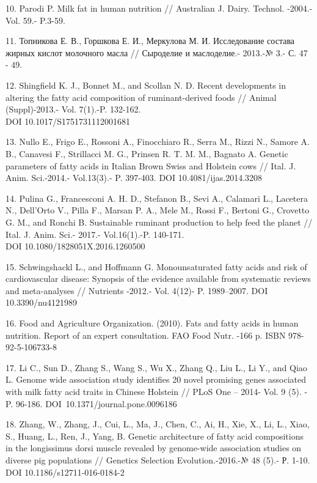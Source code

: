 \begin{noparindent}
10. Parodi P. Milk fat in human nutrition // Australian J. Dairy.
Technol. -2004.-Vol. 59.- P.3-59.

11. Топникова Е. В., Горшкова Е. И., Меркулова М. И. Исследование
состава жирных кислот молочного масла // Сыроделие и маслоделие.-
2013.-№ 3.- С. 47 - 49.

12. Shingfield K. J., Bonnet M., and Scollan N. D. Recent developments
in altering the fatty acid composition of ruminant-derived foods //
Animal (Suppl)-2013.- Vol. 7(1).-P. 132-162. \\DOI 10.1017/S1751731112001681

13. Nullo E., Frigo E., Rossoni A., Finocchiaro R., Serra M., Rizzi N.,
Samore A. B., Canavesi F., Strillacci M. G., Prinsen R. T. M. M.,
Bagnato A. Genetic parameters of fatty acids in Italian Brown Swiss and
Holstein cows // Ital. J. Anim. Sci.-2014.- Vol.13(3).- P. 397-403. DOI 10.4081/ijas.2014.3208

14. Pulina G., Francesconi A. H. D., Stefanon B., Sevi A., Calamari L.,
Lacetera N., Dell'Orto V., Pilla F., Marsan P. A., Mele M., Rossi F.,
Bertoni G., Crovetto G. M., and Ronchi B. Sustainable ruminant
production to help feed the planet // Ital. J. Anim. Sci.- 2017.-
Vol.16(1).-P. 140-171. \\DOI 10.1080/1828051X.2016.1260500

15. Schwingshackl L., and Hoffmann G. Monounsaturated fatty acids and
risk of cardiovascular disease: Synopsis of the evidence available from
systematic reviews and meta-analyses // Nutrients -2012.- Vol. 4(12)- P.
1989--2007. DOI 10.3390/nu4121989

16. Food and Agriculture Organization. (2010). Fats and fatty acids in
human nutrition. Report of an expert consultation. FAO Food Nutr. -166
p. ISBN 978-92-5-106733-8

17. Li C., Sun D., Zhang S., Wang S., Wu X., Zhang Q., Liu L., Li Y.,
and Qiao L. Genome wide association study identifies 20 novel promising
genes associated with milk fatty acid traits in Chinese Holstein // PLoS
One -- 2014- Vol. 9 (5). - P. 96-186. DOI~10.1371/journal.pone.0096186

18. Zhang, W., Zhang, J., Cui, L., Ma, J., Chen, C., Ai, H., Xie, X.,
Li, L., Xiao, S., Huang, L., Ren, J., Yang, B. Genetic architecture of
fatty acid compositions in the longissimus dorsi muscle revealed by
genome-wide association studies on diverse pig populations // Genetics
Selection Evolution.-2016.-№ 48 (5).- Р. 1-10. DOI
10.1186/s12711-016-0184-2


\end{noparindent}
